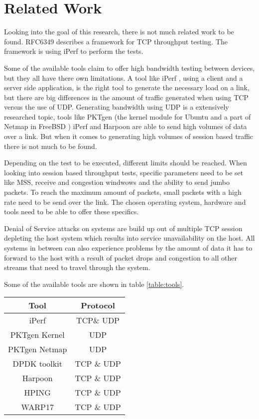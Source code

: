 \section{Related Work}

Looking into the goal of this research, there is not much related work to be found.
RFC6349 \cite{RFC6349} describes a framework for TCP throughput testing. The framework is using iPerf to perform the tests.     

Some of the available tools claim to offer high bandwidth testing between devices, but they all have there own limitations. 
A tool like iPerf \cite{iperf} , using a client and a server side application, is the right tool to generate the necessary load on a link, but there are big differences in the amount of traffic generated when using TCP versus the use of UDP.
Generating bandwidth using UDP is a extensively researched topic, tools like PKTgen (the kernel module for Ubuntu \cite{pktgen}  and a part of Netmap in FreeBSD \cite{freebsd-netmap}) iPerf \cite{iperf} and Harpoon \cite{harpoon} are able to send high volumes of data over a link. But when it comes to generating high volumes of session based traffic there is not much to be found.  

Depending on the test to be executed, different limits should be reached. 
When looking into session based throughput tests, specific parameters need to be set like MSS, receive and congestion windwows and the ability to send jumbo packets.
To reach the maximum amount of packets, small packets with a high rate need to be send over the link. The chosen operating system, hardware and tools need to be able to offer these specifics.

Denial of Service attacks on systems are build up out of multiple TCP session depleting the host system which results into service unavailability on the host. All systems in between can also experience problems by the amount of data it has to forward to the host with a result of packet drops and congestion to all other streams that need to travel through the system.

Some of the available tools are shown in table \ref{table:tools}.

\begin{table*}[ht]
\centering
\begin{tabular}{|c|c|} \hline
\textbf{Tool} & \textbf{Protocol} \\ \hline
iPerf & TCP\& UDP \\ \hline
PKTgen Kernel & UDP \\ \hline
PKTgen Netmap & UDP \\ \hline
DPDK toolkit & TCP \& UDP \\ \hline
Harpoon & TCP \& UDP \\ \hline
HPING  & TCP \& UDP\\ \hline
WARP17 & TCP \& UDP \\ \hline

\end{tabular}
\caption{available tools}
\label{table:tools}
\end{table*}

